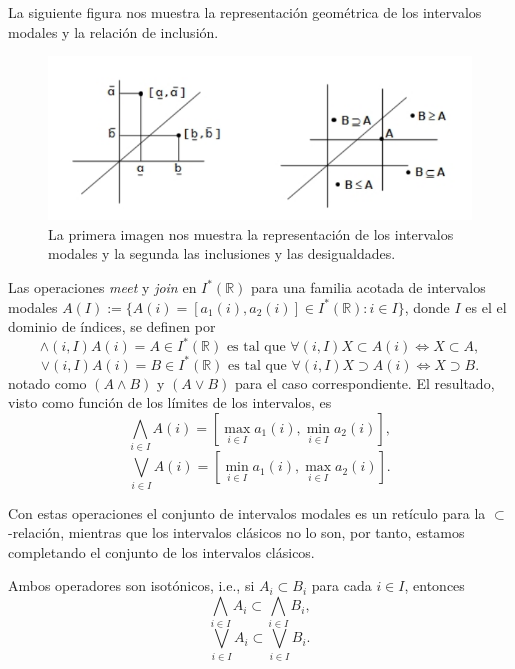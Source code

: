 La siguiente figura nos muestra la representación geométrica de los intervalos modales y la relación de inclusión.
\begin{figure}[h]
\centering
\includegraphics[scale=0.5]{images/florez11.png}
\caption{La primera imagen nos muestra la representación de los intervalos modales y la segunda las inclusiones y las desigualdades.}
\end{figure}

\newpage
Las operaciones{ \em meet} y{ \em join} en $I^*(\mathbb{R})$ para una familia acotada de intervalos modales $A(I) := \{ A(i) = [a_1(i),a_2(i)] \in I^*(\mathbb{R}) : i \in I \}$, donde $I$ es el el dominio de índices, se definen por
\begin{equation}
\wedge(i,I) A(i) = A \in I^*(\mathbb{R}) \text{ es  tal que } \forall (i,I) X \subset A(i) \iff X \subset A,
\nonumber
\end{equation}
\begin{equation}
\vee(i,I) A(i) = B \in I^*(\mathbb{R}) \text{ es  tal que } \forall (i,I) X \supset A(i) \iff X \supset B.
\nonumber
\end{equation}
notado como $(A \wedge B)$ y $(A \vee B)$ para el caso correspondiente. El resultado, visto como función de los límites de los intervalos, es
\begin{equation}
\bigwedge_{i \in I} A(i) = [\max_{i \in I} a_1(i), \min_{i \in I} a_2(i)],
\nonumber
\end{equation}
\begin{equation}
\bigvee_{i \in I} A(i) = [\min_{i \in I} a_1(i), \max_{i \in I} a_2(i)].
\nonumber
\end{equation}

Con estas operaciones el conjunto de intervalos modales es un retículo para la $\subset$-relación, mientras que los intervalos clásicos no lo son, por tanto, estamos completando el conjunto de los intervalos clásicos.

Ambos operadores son isotónicos, i.e.,  si $A_i \subset B_i$ para cada $i \in I$, entonces
\begin{equation}
\bigwedge_{i \in I} A_i \subset \bigwedge_{i \in I} B_i,
\nonumber
\end{equation}
\begin{equation}
\bigvee_{i \in I} A_i \subset \bigvee_{i \in I} B_i.
\nonumber
\end{equation}

